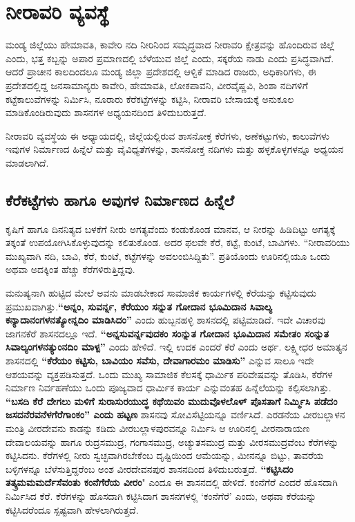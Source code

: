 
\chapter{ನೀರಾವರಿ ವ್ಯವಸ್ಥೆ}

ಮಂಡ್ಯ ಜಿಲ್ಲೆಯು ಹೇಮಾವತಿ, ಕಾವೇರಿ ನದಿ ನೀರಿನಿಂದ ಸಮೃದ್ಧವಾದ ನೀರಾವರಿ ಕ್ಷೇತ್ರವನ್ನು ಹೊಂದಿರುವ ಜಿಲ್ಲೆ ಎಂದು, ಭತ್ತ ಕಬ್ಬನ್ನು ಅಪಾರ ಪ್ರಮಾಣದಲ್ಲಿ ಬೆಳೆಯುವ ಜಿಲ್ಲೆ ಎಂದು, ಸಕ್ಕರೆಯ ನಾಡು ಎಂದು ಪ್ರಸಿದ್ಧವಾಗಿದೆ. ಆದರೆ ಪ್ರಾಚೀನ ಕಾಲದಿಂದಲೂ ಮಂಡ್ಯ ಜಿಲ್ಲಾ ಪ್ರದೇಶದಲ್ಲಿ ಆಳ್ವಿಕೆ ಮಾಡಿದ ರಾಜರು, ಅಧಿಕಾರಿಗಳು, ಈ ಪ್ರದೇಶದಲ್ಲಿದ್ದ ಜನಸಾಮಾನ್ಯರು ಕಾವೇರಿ, ಹೇಮಾವತಿ, ಲೋಕಪಾವನಿ, ವೀರವೈಷ್ಣವಿ, ಶಿಂಶಾ ನದಿಗಳಿಗೆ ಕಟ್ಟೆಕಾಲುವೆಗಳನ್ನು ನಿರ್ಮಿಸಿ, ನೂರಾರು ಕೆರೆಕಟ್ಟೆಗಳನ್ನು ಕಟ್ಟಿಸಿ, ನೀರಾವರಿ ಬೇಸಾಯಕ್ಕೆ ಅನುಕೂಲ ಮಾಡಿಕೊಂಡಿರುವುದು ಶಾಸನಗಳ ಅಧ್ಯಯನದಿಂದ ತಿಳಿದುಬರುತ್ತದೆ.

ನೀರಾವರಿ ವ್ಯವಸ್ಥೆಯ ಈ ಅಧ್ಯಾಯದಲ್ಲಿ, ಜಿಲ್ಲೆಯಲ್ಲಿರುವ ಶಾಸನೋಕ್ತ ಕೆರೆಗಳು, ಅಣೆಕಟ್ಟುಗಳು, ಕಾಲುವೆಗಳು ಇವುಗಳ ನಿರ್ಮಾಣದ ಹಿನ್ನೆಲೆ ಮತ್ತು ವೈವಿಧ್ಯತೆಗಳನ್ನು, ಶಾಸನೋಕ್ತ ನದಿಗಳು ಮತ್ತು ಹಳ್ಳಕೊಳ್ಳಗಳನ್ನೂ ಅಧ್ಯಯನ ಮಾಡಲಾಗಿದೆ.

\section{ಕೆರೆಕಟ್ಟೆಗಳು ಹಾಗೂ ಅವುಗಳ ನಿರ್ಮಾಣದ ಹಿನ್ನೆಲೆ}

ಕೃಷಿಗೆ ಹಾಗೂ ದಿನನಿತ್ಯದ ಬಳಕೆಗೆ ನೀರು ಅಗತ್ಯವೆಂದು ಕಂಡುಕೊಂಡ ಮಾನವ, ಆ ನೀರನ್ನು ಹಿಡಿದಿಟ್ಟು ಅಗತ್ಯಕ್ಕೆ ತಕ್ಕಂತೆ ಉಪಯೋಗಿಸಿಕೊಳ್ಳುವುದನ್ನು ಕಲಿತುಕೊಂಡ. ಅದರ ಫಲವೇ ಕೆರೆ, ಕಟ್ಟೆ, ಕುಂಟೆ, ಬಾವಿಗಳು. “ನೀರಾವರಿಯು ಮುಖ್ಯವಾಗಿ ನದಿ, ಬಾವಿ, ಕೆರೆ, ಕುಂಟೆ, ಕಟ್ಟೆಗಳನ್ನು ಅವಲಂಬಿಸಿದ್ದಿತು”. ಪ್ರತಿಯೊಂದು ಊರಿನಲ್ಲಿಯೂ ಒಂದು ಅಥವಾ ಅದಕ್ಕಿಂತ ಹೆಚ್ಚು ಕೆರೆಗಳಿರುತ್ತಿದ್ದವು.

ಮನುಷ್ಯನಾಗಿ ಹುಟ್ಟಿದ ಮೇಲೆ ಅವನು ಮಾಡಬೇಕಾದ ಸಾಮಾಜಿಕ ಕಾರ್ಯಗಳಲ್ಲಿ ಕೆರೆಯನ್ನು ಕಟ್ಟಿಸುವುದು ಪ್ರಮುಖವಾಗಿತ್ತು.\textbf{“ಅನ್ನಂ, ಸುವರ್ನ್ನ, ಕೆರೆಯುಂ ಸನ್ನುತ ಗೋದಾನ ಭೂಮಿದಾನ ಸಿವಾಲ್ಯ ಕನ್ಯಾದಾನಂಗಳನತ್ಯೋನ್ನದಿಂ ಮಾಡಿಸಿದಂ” }ಎಂದು ಹುಬ್ಬನಹಳ್ಳಿ ಶಾಸನದಲ್ಲಿ ಪಟ್ಟಿಮಾಡಿದೆ. ಇದೇ ವಿಚಾರವು ಜಾಗನಕೆರೆ ಶಾಸನದಲ್ಲೂ ಇದೆ. \textbf{“ಅನ್ನಸುವರ್ನ್ನವುದಕಂ ಸಂನ್ನುತ ಗೋದಾನ ಭೂಮಿದಾನ ಸಮೇತಂ ಸಂನ್ನುತ ಸಿವಾಲ್ಯಂಗಳನತ್ಯುಂನದಿಂ ಮಾಳ್ಪ”} ಎಂದು ಹೇಳಿದೆ. ಇಲ್ಲಿ ಉದಕ ಎಂದರೆ ಕೆರೆ ಎಂದು ಅರ್ಥ. ಲಕ್ಷ್ಮೀಧರ ಅಮಾತ್ಯನ ಶಾಸನದಲ್ಲಿ \textbf{“ಕೆರೆಯಂ ಕಟ್ಟಿಸು, ಬಾವಿಯಂ ಸವೆಸು, ದೇವಾಗಾರಮಂ ಮಾಡಿಸು”} ಎನ್ನುವ ಸಾಲೂ ಇದೇ ಆಶಯವನ್ನು ವ್ಯಕ್ತಪಡಿಸುತ್ತದೆ. ಒಂದು ಮುಖ್ಯ ಸಾಮಾಜಿಕ ಕೆಲಸಕ್ಕೆ ಧಾರ್ಮಿಕ ಪರಿವೇಷವನ್ನು ತೊಡಿಸಿ, ಕೆರೆಗಳ ನಿರ್ಮಾಣ ನಿರ್ವಹಣೆಯು ಒಂದು ಪೂಜ್ಯವಾದ ಧಾರ್ಮಿಕ ಕಾರ್ಯ ಎನ್ನುವಂತಹ ಹಿನ್ನೆಲೆಯನ್ನು ಕಲ್ಪಿಸಲಾಗಿತ್ತು. \textbf{“ಬಸದಿ ಕೆರೆ ದೇಗಲು ಮಳಿಗೆ ಸುರಾಸುರಯುದ್ಧ ಕಥೆಯಿವಂ ಮುದುವೊಳಲೊಳ್​ ಪೊಸತಾಗೆ ನಿರ್ಮ್ಮಿಸಿ ಪಡೆದಂ ಜಸದನೆರವನೆಳಗೆರೆಗಾಂಕಂ” ಎಂದು ಹಟ್ಟಣ }ಶಾಸನವು ಸೋವಿಸೆಟ್ಟಿಯನ್ನೂ ವರ್ಣಿಸಿದೆ. ಎರಡನೆಯ ವೀರಬಲ್ಲಾಳನ ಮಂತ್ರಿ ವೀರದೇವನು ಕಾಡನ್ನು ಕಡಿದು ವೀರಬಲ್ಲಾಳಪುರವನ್ನೂ ನಿರ್ಮಿಸಿ ಆ ಊರಿನಲ್ಲಿ ವೀರನಾರಾಯಣ ದೇವಾಲಯವನ್ನು ಹಾಗೂ ರುದ್ರಸಮುದ್ರ, ಗಂಗಾಸಮುದ್ರ, ಅಚ್ಯುತಸಮುದ್ರ ಮತ್ತು ವೀರಸಮುದ್ರವೆಂಬ ಕೆರೆಗಳನ್ನು ಕಟ್ಟಿಸಿದನು. ಕೆರೆಗಳಲ್ಲಿ ನೀರು ಸ್ವಚ್ಛವಾಗಿರಬೇಕೆಂಬ ದೃಷ್ಟಿಯಿಂದ ಆಮೆಯನ್ನು, ಮೀನನ್ನೂ ಬಿಟ್ಟು, ತಾವರೆಯ ಬಳ್ಳಿಗಳನ್ನೂ ಬೆಳೆಸುತ್ತಿದ್ದರೆಂಬ ಅಂಶ ವೀರದೇವನಪುರ ಶಾಸನದಿಂದ ತಿಳಿದುಬರುತ್ತದೆ.\textbf{ “ಕಟ್ಟಿಸಿದಂ ತತ್ಕ್ರಮಮಮರ್ದೆಸೆವಂತು ಕಂನೆಗೆರೆಯ ವೀರಂ}" ಎಂದೂ ಈ ಶಾಸನದಲ್ಲಿ ಹೇಳಿದೆ. ಕಂನೆಗೆರೆ ಎಂದರೆ ಹೊಸದಾಗಿ ನಿರ್ಮಿಸಿದ ಕೆರೆ. ಕೆರೆಗಳನ್ನು ಹೊಸದಾಗಿ ಕಟ್ಟಿಸಿದಾಗ ಶಾಸನಗಳಲ್ಲಿ ‘ಕಂನೆಗೆರೆ’ ಎಂದು, ಅಥವಾ ಕೆರೆಯನ್ನು ಕಟ್ಟಿಸಿದರೆಂದೂ ಸ್ಪಷ್ಟವಾಗಿ ಹೇಳಲಾಗಿರುತ್ತದೆ.

